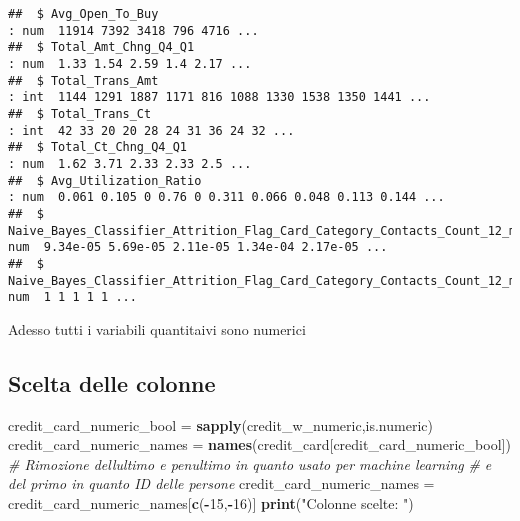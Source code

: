 \documentclass[
]{article}
\newenvironment{Shaded}{\begin{snugshade}}{\end{snugshade}}
\newcommand{\CommentTok}[1]{\textcolor[rgb]{0.56,0.35,0.01}{\textit{#1}}}
\newcommand{\DecValTok}[1]{\textcolor[rgb]{0.00,0.00,0.81}{#1}}
\newcommand{\FunctionTok}[1]{\textcolor[rgb]{0.13,0.29,0.53}{\textbf{#1}}}
\newcommand{\NormalTok}[1]{#1}
\newcommand{\OtherTok}[1]{\textcolor[rgb]{0.56,0.35,0.01}{#1}}
\newcommand{\SpecialCharTok}[1]{\textcolor[rgb]{0.81,0.36,0.00}{\textbf{#1}}}
\newcommand{\StringTok}[1]{\textcolor[rgb]{0.31,0.60,0.02}{#1}}
\begin{document}
\begin{verbatim}
##  $ Avg_Open_To_Buy                                                                                                                   : num  11914 7392 3418 796 4716 ...
##  $ Total_Amt_Chng_Q4_Q1                                                                                                              : num  1.33 1.54 2.59 1.4 2.17 ...
##  $ Total_Trans_Amt                                                                                                                   : int  1144 1291 1887 1171 816 1088 1330 1538 1350 1441 ...
##  $ Total_Trans_Ct                                                                                                                    : int  42 33 20 20 28 24 31 36 24 32 ...
##  $ Total_Ct_Chng_Q4_Q1                                                                                                               : num  1.62 3.71 2.33 2.33 2.5 ...
##  $ Avg_Utilization_Ratio                                                                                                             : num  0.061 0.105 0 0.76 0 0.311 0.066 0.048 0.113 0.144 ...
##  $ Naive_Bayes_Classifier_Attrition_Flag_Card_Category_Contacts_Count_12_mon_Dependent_count_Education_Level_Months_Inactive_12_mon_1: num  9.34e-05 5.69e-05 2.11e-05 1.34e-04 2.17e-05 ...
##  $ Naive_Bayes_Classifier_Attrition_Flag_Card_Category_Contacts_Count_12_mon_Dependent_count_Education_Level_Months_Inactive_12_mon_2: num  1 1 1 1 1 ...
\end{verbatim}

Adesso tutti i variabili quantitaivi sono numerici

\subsection{Scelta delle colonne}\label{scelta-delle-colonne-1}

\begin{Shaded}
\begin{Highlighting}[]
\NormalTok{credit\_card\_numeric\_bool }\OtherTok{=} \FunctionTok{sapply}\NormalTok{(credit\_w\_numeric,is.numeric)}
\NormalTok{credit\_card\_numeric\_names }\OtherTok{=} \FunctionTok{names}\NormalTok{(credit\_card[credit\_card\_numeric\_bool])}
\CommentTok{\# Rimozione dell\textquotesingle{}ultimo e penultimo in quanto usato per machine learning}
\CommentTok{\# e del primo in quanto ID delle persone}
\NormalTok{credit\_card\_numeric\_names }\OtherTok{=}\NormalTok{ credit\_card\_numeric\_names[}\FunctionTok{c}\NormalTok{(}\SpecialCharTok{{-}}\DecValTok{15}\NormalTok{,}\SpecialCharTok{{-}}\DecValTok{16}\NormalTok{)]}
\FunctionTok{print}\NormalTok{(}\StringTok{"Colonne scelte: "}\NormalTok{)}
\end{Highlighting}
\end{Shaded}
\end{document}
